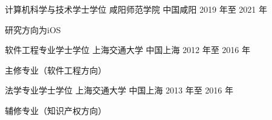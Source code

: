 

\begin{cventries}

  \cventry
    {计算机科学与技术学士学位} %
    {咸阳师范学院} %
    {中国咸阳} %
    {2019 年至 2021 年} %
    {
      \begin{cvitems} %
        \item 研究方向为iOS
      \end{cvitems}
    }

  \cventry
    {软件工程专业学士学位} %
    {上海交通大学} %
    {中国上海} %
    {2012 年至 2016 年} %
    {
      \begin{cvitems} %
        \item 主修专业（软件工程方向）
      \end{cvitems}
    }

  \cventry
    {法学专业学士学位} %
    {上海交通大学} %
    {中国上海} %
    {2013 年至 2016 年} %
    {
      \begin{cvitems} %
      \item 辅修专业（知识产权方向）
      \end{cvitems}
    }
\end{cventries}
